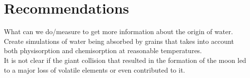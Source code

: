 
\section{Recommendations}
What can we do/measure to get more information about the origin of water.\\

Create simulations of water being absorbed by grains that takes into account both physisorption and chemisorption at reasonable temperatures.\\

It is not clear if the giant collision that resulted in the formation of the moon led to a major loss of volatile elements or even contributed to it.\\